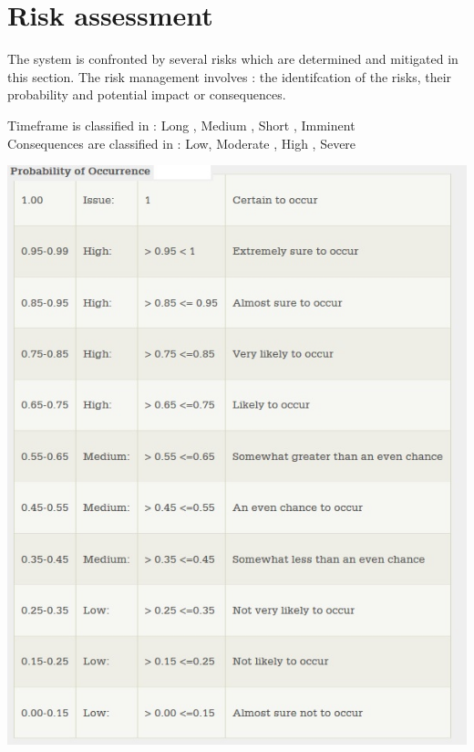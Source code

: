 \section{Risk assessment}
The system is confronted by several risks which are determined and mitigated in this section.
The risk management involves : the identifcation of the risks, their probability and potential impact or consequences.

Timeframe is classified in : Long , Medium , Short , Imminent \\
Consequences are classified in : Low, Moderate , High , Severe


\includegraphics[scale=0.5]{3-requirements/Images/RISKSOCCURENCE.jpg} %
